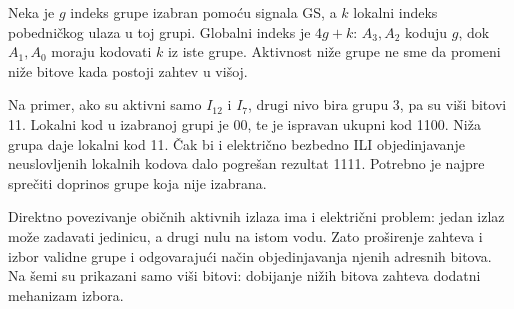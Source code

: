 
Neka je \(g\) indeks grupe izabran pomoću signala GS, a \(k\) lokalni indeks pobedničkog ulaza u toj grupi. Globalni indeks je \(4g+k\): \(A_3,A_2\) koduju \(g\), dok \(A_1,A_0\) moraju kodovati \(k\) iz iste grupe. Aktivnost niže grupe ne sme da promeni niže bitove kada postoji zahtev u višoj.

Na primer, ako su aktivni samo \(I_{12}\) i \(I_7\), drugi nivo bira grupu 3, pa su viši bitovi 11. Lokalni kod u izabranoj grupi je 00, te je ispravan ukupni kod 1100. Niža grupa daje lokalni kod 11. Čak bi i električno bezbedno ILI objedinjavanje neuslovljenih lokalnih kodova dalo pogrešan rezultat 1111. Potrebno je najpre sprečiti doprinos grupe koja nije izabrana.

Direktno povezivanje običnih aktivnih izlaza ima i električni problem: jedan izlaz može zadavati jedinicu, a drugi nulu na istom vodu. Zato proširenje zahteva i izbor validne grupe i odgovarajući način objedinjavanja njenih adresnih bitova. Na šemi su prikazani samo viši bitovi: dobijanje nižih bitova zahteva dodatni mehanizam izbora.
